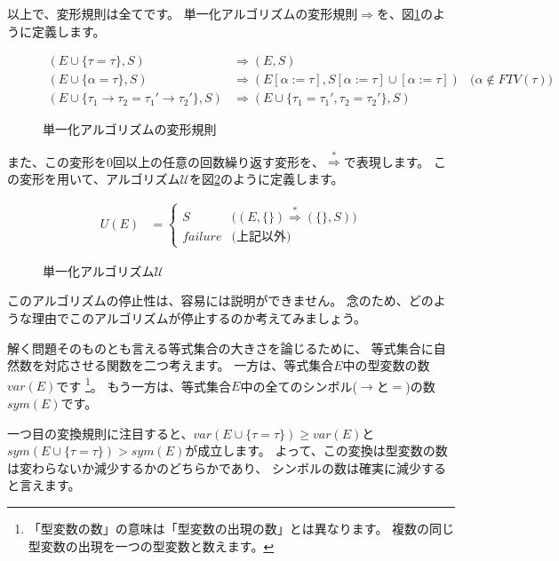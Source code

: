 以上で、変形規則は全てです。
単一化アルゴリズムの変形規則$\Longrightarrow$を、図\ref{fig:unification-trans}のように定義します。

\begin{figure}[htbp]
  \begin{align*}
    (E \cup \{\tau = \tau\}, S)
      &\Longrightarrow (E, S) \\
    (E \cup \{\alpha = \tau\}, S)
      &\Longrightarrow (E[\alpha := \tau], S[\alpha := \tau] \cup [\alpha := \tau])
      &\text{($\alpha \notin \mathit{FTV(\tau)}$)}\\
    (E \cup \{\tau_1 \to \tau_2 = \tau_1' \to \tau_2'\}, S)
      &\Longrightarrow (E \cup \{\tau_1 = \tau_1', \tau_2 = \tau_2'\}, S)
  \end{align*}
  \caption{単一化アルゴリズムの変形規則}
  \label{fig:unification-trans}
\end{figure}

また、この変形を0回以上の任意の回数繰り返す変形を、$\stackrel{*}{\Longrightarrow}$で表現します。
この変形を用いて、アルゴリズム$\mathcal U$を図\ref{fig:algorithm-u}のように定義します。

\begin{figure}[htbp]
  \begin{align*}
    U(E) &=
    \begin{cases}
      S & \text{($(E, \{\}) \stackrel{*}{\Longrightarrow} (\{\}, S)$)} \\
      \mathit{failure} & \text{(上記以外)}
    \end{cases}
  \end{align*}
  \caption{単一化アルゴリズム$\mathcal U$}
  \label{fig:algorithm-u}
\end{figure}

このアルゴリズムの停止性は、容易には説明ができません。
念のため、どのような理由でこのアルゴリズムが停止するのか考えてみましょう。

解く問題そのものとも言える等式集合の大きさを論じるために、
等式集合に自然数を対応させる関数を二つ考えます。
一方は、等式集合$E$中の型変数の数$\mathit{var}(E)$です
\footnote{「型変数の数」の意味は「型変数の出現の数」とは異なります。
複数の同じ型変数の出現を一つの型変数と数えます。}。
もう一方は、等式集合$E$中の全てのシンボル($\to$と$=$)の数$\mathit{sym}(E)$です。

一つ目の変換規則に注目すると、$\mathit{var}(E \cup \{\tau = \tau\}) \ge \mathit{var}(E)$と
$\mathit{sym}(E \cup \{\tau = \tau\}) > \mathit{sym}(E)$が成立します。
よって、この変換は型変数の数は変わらないか減少するかのどちらかであり、
シンボルの数は確実に減少すると言えます。

